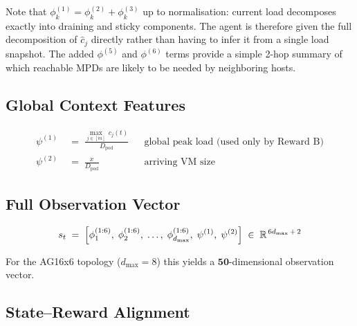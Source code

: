 \documentclass[11pt]{article}
\begin{document}
Note that $\phi_k^{(1)} = \phi_k^{(2)} + \phi_k^{(3)}$ up to
normalisation: current load decomposes exactly into draining and
sticky components.  The agent is therefore given the full
decomposition of $\hat{c}_j$ directly rather than having to
infer it from a single load snapshot.  The added
$\phi^{(5)}$ and $\phi^{(6)}$ terms provide a simple 2-hop summary of
which reachable MPDs are likely to be needed by neighboring hosts.

\subsection{Global Context Features}

\begin{align}
    \psi^{(1)} &\;=\;
        \frac{\displaystyle\max_{j \in [m]}\, c_j(t)}{D_\mathrm{pod}}
        && \text{global peak load (used only by Reward B)}
        \label{eq:psi1} \\[6pt]
    \psi^{(2)} &\;=\;
        \frac{x}{D_\mathrm{pod}}
        && \text{arriving VM size}
        \label{eq:psi2}
\end{align}

\subsection{Full Observation Vector}

\begin{equation}
    s_t
    \;=\;
    \Bigl[
        \phi_1^{(1:6)},\;
        \phi_2^{(1:6)},\;
        \ldots,\;
        \phi_{d_\mathrm{max}}^{(1:6)},\;
        \psi^{(1)},\;
        \psi^{(2)}
    \Bigr]
    \;\in\; \mathbb{R}^{\,6 d_\mathrm{max} \,+\, 2}
    \label{eq:obs}
\end{equation}

For the AG16x6 topology ($d_\mathrm{max} = 8$) this yields a
$\mathbf{50}$-dimensional observation vector.

\subsection{State--Reward Alignment}
\end{document}
